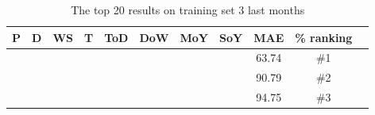 \begin{table}[H]
\centering  %
\begin{tabular}{|c|c|c|c|c|c|c|c|c|c|c|} %
\hline
P & D & WS & T & ToD & DoW & MoY & SoY & MAE & \% ranking\\ [0.5ex] %
\hline
\x    & \x    & \x    & \x    & \x\m  & \x\m  & \x\m  &       & 63.74 & \#1 \\ \hline
\x    & \x    & \x    & \x    & \x\m  & \x\m  &       &       & 90.79 & \#2 \\ \hline
\x    & \x    & \x    & \x    & \x\m  & \x\m  &       & \x\m  & 94.75 & \#3 \\ \hline
\end{tabular}
\caption{The top 20 results on training set 3 last months} %
\label{table:1YearTrain} %
\end{table}

